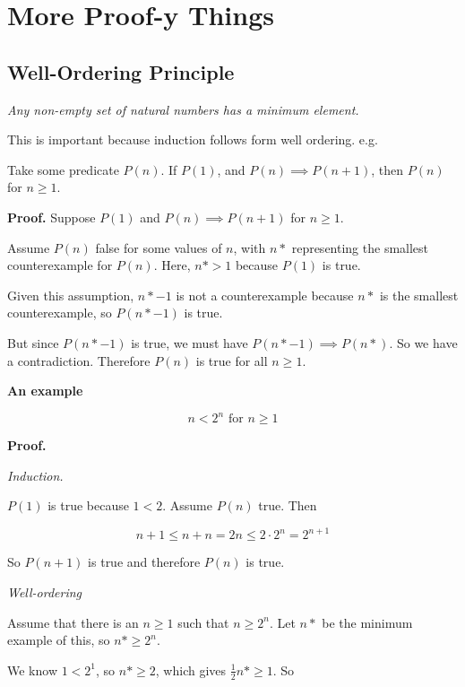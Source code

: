 \documentclass{article}
\begin{document}

\newpage

\section*{More Proof-y Things}

\subsection*{Well-Ordering Principle}

\textit{Any non-empty set of natural numbers has a minimum element.}

\smallskip

This is important because induction follows form well ordering. e.g.

Take some predicate $P(n)$. If $P(1)$, and $P(n) \implies P(n+1)$, then $P(n)$ for $n \geq 1$.

\noindent\textbf{Proof.} Suppose $P(1)$ and $P(n) \implies P(n+1)$ for $n \geq 1$.

Assume $P(n)$ false for some values of $n$, with $n*$ representing the smallest counterexample for $P(n)$. Here, $n* > 1$ because $P(1)$ is true. 

Given this assumption, $n*-1$ is not a counterexample because $n*$ is the smallest counterexample, so $P(n* -1)$ is true.

But since $P(n*-1)$ is true, we must have $P(n*-1) \implies P(n*)$. So we have a contradiction. Therefore $P(n)$ is true for all $n \geq 1$.

\noindent\textbf{An example}

$$n < 2^n \text{ for } n \geq 1$$

\noindent\textbf{Proof.}

\noindent \textit{Induction.}  

$P(1)$ is true because $1 < 2$. Assume $P(n)$ true. Then

$$n + 1 \leq n + n = 2n \leq 2 \cdot 2^n = 2^{n+1}$$

So $P(n+1)$ is true and therefore $P(n)$ is true.

\smallskip

\noindent \textit{Well-ordering}

Assume that there is an $n \geq 1$ such that $n \geq 2^n$. Let $n*$ be the minimum example of this, so $n* \geq 2^n$. 

We know $1 < 2^1$, so $n* \geq 2$, which gives $\frac{1}{2}n* \geq 1$. So
\end{document}
